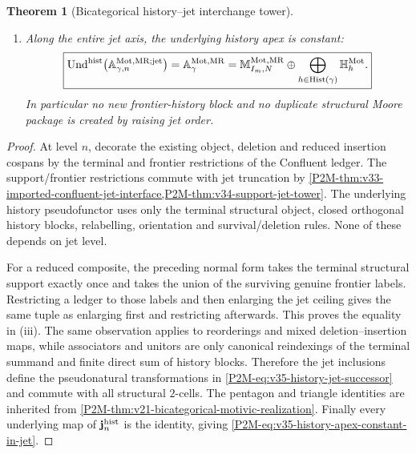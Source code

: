 \documentclass[11pt]{article}
\newtheorem{theorem}{Theorem}[section]
\theoremstyle{remark}
\newcommand{\Mot}{\mathrm{Mot}}
\newcommand{\MR}{\mathrm{MR}}
\begin{document}
\begin{theorem}[Bicategorical history--jet interchange tower]
\begin{enumerate}[label=\textup{(\roman*)}]
      $\mathbf j_n^{\rm hist}$.  Hence the pentagon and triangle identities
      hold simultaneously at every finite jet level.
\item Along the entire jet axis, the underlying history apex is constant:
      \begin{equation}
       \boxed{
       \operatorname{Und}^{\rm hist}
       \bigl(\mathbb A^{\Mot,\MR;\mathrm{jet}}_{\gamma,n}\bigr)
       =
       \mathbb A^{\Mot,\MR}_{\gamma}
       =
       \mathbb M^{\Mot,\MR}_{I_m,N}
        \oplus
        \bigoplus_{h\in\operatorname{Hist}(\gamma)}
        \mathbb H_h^{\Mot}.}
       \label{P2M-eq:v35-history-apex-constant-in-jet}
      \end{equation}
      In particular no new frontier-history block and no duplicate structural
      Moore package is created by raising jet order.
\end{enumerate}
\end{theorem}

\begin{proof}
At level $n$, decorate the existing object, deletion and reduced insertion
cospans by the terminal and frontier restrictions of the Confluent ledger.
The support/frontier restrictions commute with jet truncation by
\cref{P2M-thm:v33-imported-confluent-jet-interface,P2M-thm:v34-support-jet-tower}.
The underlying history pseudofunctor uses only the terminal structural object,
closed orthogonal history blocks, relabelling, orientation and
survival/deletion rules.  None of these depends on jet level.

For a reduced composite, the preceding normal form takes the terminal structural
support exactly once and takes the union of the surviving genuine frontier
labels.  Restricting a ledger to those labels and then enlarging the jet
ceiling gives the same tuple as enlarging first and restricting afterwards.
This proves the equality in \textup{(iii)}.  The same observation applies to
reorderings and mixed deletion--insertion maps, while associators and unitors
are only canonical reindexings of the terminal summand and finite direct sum of
history blocks.  Therefore the jet inclusions define the pseudonatural
transformations in \eqref{P2M-eq:v35-history-jet-successor} and commute with all
structural $2$-cells.  The pentagon and triangle identities are inherited from
\cref{P2M-thm:v21-bicategorical-motivic-realization}.  Finally every underlying
map of $\mathbf j_n^{\rm hist}$ is the identity, giving
\eqref{P2M-eq:v35-history-apex-constant-in-jet}.
\end{proof}
\end{document}
